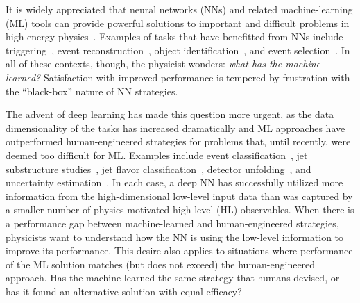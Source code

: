 \documentclass[aps,prd,twocolumn,superscriptaddress,preprintnumbers,nofootinbib,longbibliography,floatfix]{revtex4-1}
\begin{document}
It is widely appreciated that neural networks (NNs) and related machine-learning (ML) tools can provide powerful solutions to important and difficult problems in high-energy physics~\cite{Guest:2018yhq,Radovic:2018dip}. Examples of tasks that have benefitted from NNs include triggering~\cite{Kohne:1997ph}, event reconstruction~\cite{Aad:2014yva,Peterson:1988gs}, object identification~\cite{Abramowicz:1995zi,Khachatryan:2014ira,Abazov:2004vd}, and event selection~\cite{ABREU1992383,Abazov2001282,Aaltonen:2009jg}. In all of these contexts, though, the physicist wonders:  \emph{what has the machine learned?} Satisfaction with improved performance is tempered by frustration with the ``black-box'' nature of NN strategies.

The advent of deep learning has made this question more urgent, as the data dimensionality of the tasks has increased dramatically and ML approaches have outperformed human-engineered strategies for problems that, until recently, were deemed too difficult for ML. Examples include event classification~\cite{Baldi:2014kfa,Baldi:2014pta,Santos:2016kno,Aurisano:2016jvx,Cohen:2017exh,Andrews:2018gew}, jet substructure studies~\cite{Almeida:2015jua,deOliveira:2015xxd,Baldi:2016fql,Larkoski:2017jix,Kasieczka:2017nvn}, jet flavor classification~\cite{Guest:2016iqz,ATL-PHYS-PUB-2017-003,CMS-DP-2017-005,Sirunyan:2017ezt,Komiske:2016rsd}, detector unfolding~\cite{Andreassen:2019cjw,Datta:2018mwd,Bellagente:2020piv}, and uncertainty estimation~\cite{Englert:2018cfo,Barnard:2016qma,Bollweg:2019skg,Nachman:2019dol,Kasieczka:2020vlh}. In each case, a deep NN has successfully utilized more information from the high-dimensional low-level input data than was captured by a smaller number of physics-motivated high-level (HL) observables. When there is a performance gap between machine-learned and human-engineered strategies, physicists want to understand how the NN is using the low-level information to improve its performance. This desire also applies to situations where performance of the ML solution matches (but does not exceed) the human-engineered approach. Has the machine learned the same strategy that humans devised, or has it found an alternative solution with equal efficacy?
\end{document}
